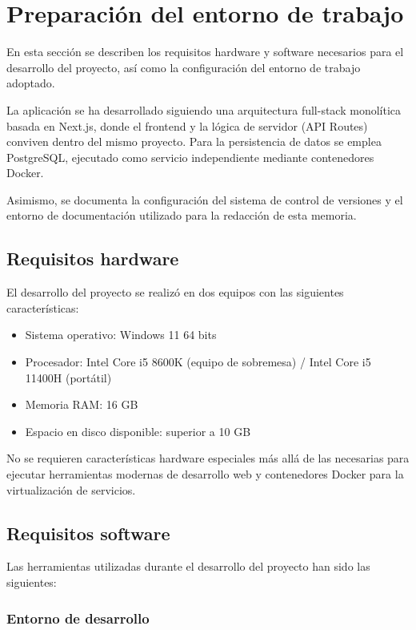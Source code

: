 \section{Preparación del entorno de trabajo}

En esta sección se describen los requisitos hardware y software necesarios para el desarrollo del proyecto, así como la configuración del entorno de trabajo adoptado.

La aplicación se ha desarrollado siguiendo una arquitectura full-stack monolítica basada en Next.js, donde el frontend y la lógica de servidor (API Routes) conviven dentro del mismo proyecto. Para la persistencia de datos se emplea PostgreSQL, ejecutado como servicio independiente mediante contenedores Docker.

Asimismo, se documenta la configuración del sistema de control de versiones y el entorno de documentación utilizado para la redacción de esta memoria.

\subsection{Requisitos hardware}

El desarrollo del proyecto se realizó en dos equipos con las siguientes características:

\begin{itemize}
    \item Sistema operativo: Windows 11 64 bits
    \item Procesador: Intel Core i5 8600K (equipo de sobremesa) / Intel Core i5 11400H (portátil)
    \item Memoria RAM: 16 GB
    \item Espacio en disco disponible: superior a 10 GB
\end{itemize}

No se requieren características hardware especiales más allá de las necesarias para ejecutar herramientas modernas de desarrollo web y contenedores Docker para la virtualización de servicios.

\subsection{Requisitos software}

Las herramientas utilizadas durante el desarrollo del proyecto han sido las siguientes:

\subsubsection*{Entorno de desarrollo}


